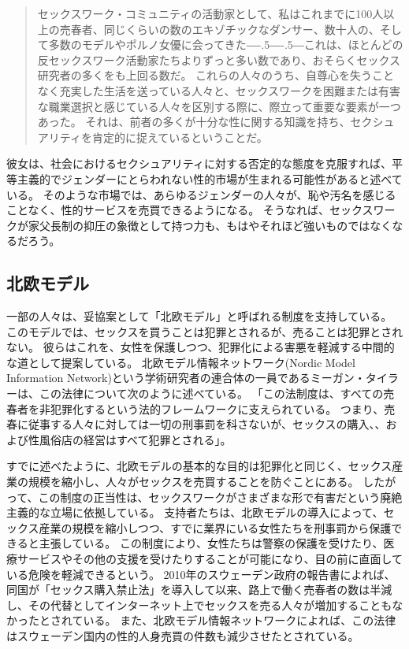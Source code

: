 \documentclass[paper=a4,book,openany]{jlreq}
\def\DDASH{―\kern-.5\zw―\kern-.5\zw―} %
\begin{document}
\begin{quote}
セックスワーク・コミュニティの活動家として、私はこれまでに100人以上の売春者、同じくらいの数のエキゾチックなダンサー、数十人の、そして多数のモデルやポルノ女優に会ってきた{\DDASH}これは、ほとんどの反セックスワーク活動家たちよりずっと多い数であり、おそらくセックス研究者の多くをも上回る数だ。
これらの人々のうち、自尊心を失うことなく充実した生活を送っている人々と、セックスワークを困難または有害な職業選択と感じている人々を区別する際に、際立って重要な要素が一つあった。
それは、前者の多くが十分な性に関する知識を持ち、セクシュアリティを肯定的に捉えているということだ。
\citep[pp.128--129]{queen97:_sex_radic_polit_sex_posit}
\end{quote}

彼女は、社会におけるセクシュアリティに対する否定的な態度を克服すれば、平等主義的でジェンダーにとらわれない性的市場が生まれる可能性があると述べている。
そのような市場では、あらゆるジェンダーの人々が、恥や汚名を感じることなく、性的サービスを売買できるようになる。
そうなれば、セックスワークが家父長制の抑圧の象徴として持つ力も、もはやそれほど強いものではなくなるだろう。

\subsection{北欧モデル}

一部の人々は、妥協案として「北欧モデル」と呼ばれる制度を支持している。
このモデルでは、セックスを買うことは犯罪とされるが、売ることは犯罪とされない。
彼らはこれを、女性を保護しつつ、犯罪化による害悪を軽減する中間的な道として提案している。
北欧モデル情報ネットワーク(Nordic Model Information Network)という学術研究者の連合体の一員であるミーガン・タイラーは、この法律について次のように述べている。
「この法制度は、すべての売春者を非犯罪化するという法的フレームワークに支えられている。
つまり、売春に従事する人々に対しては一切の刑事罰を科さないが、セックスの購入、、および性風俗店の経営はすべて犯罪とされる」\citep{woodward16:_calls_austr_adopt_nordic_model_prost}。

すでに述べたように、北欧モデルの基本的な目的は犯罪化と同じく、セックス産業の規模を縮小し、人々がセックスを売買することを防ぐことにある。
したがって、この制度の正当性は、セックスワークがさまざまな形で有害だという廃絶主義的な立場に依拠している。
支持者たちは、北欧モデルの導入によって、セックス産業の規模を縮小しつつ、すでに業界にいる女性たちを刑事罰から保護できると主張している。
この制度により、女性たちは警察の保護を受けたり、医療サービスやその他の支援を受けたりすることが可能になり、目の前に直面している危険を軽減できるという。
2010年のスウェーデン政府の報告書によれば、同国が「セックス購入禁止法」を導入して以来、路上で働く売春者の数は半減し、その代替としてインターネット上でセックスを売る人々が増加することもなかったとされている\citep{sweden10:_repor_sou}。
また、北欧モデル情報ネットワークによれば、この法律はスウェーデン国内の性的人身売買の件数も減少させたとされている\citep[p.25]{commons16:_prost}。
\end{document}
